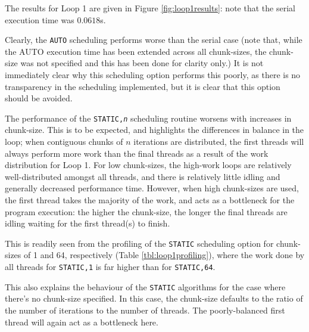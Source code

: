 \documentclass{article} %
\newcommand{\tp}{\texttt}
\begin{document}
The results for Loop 1 are given in Figure \ref{fig:loop1results}: note that the serial execution time was $0.0618$s.

Clearly, the \tp{AUTO} scheduling performs worse than the serial case (note that, while the AUTO execution time has been extended across all chunk-sizes, the chunk-size was not specified and this has been done for clarity only.)
It is not immediately clear why this scheduling option performs this poorly, as there is no transparency in the scheduling implemented, but it is clear that this option should be avoided.

The performance of the \tp{STATIC,\textit{n}} scheduling routine worsens with increases in chunk-size.
This is to be expected, and highlights the differences in balance in the loop; when contiguous chunks of $n$ iterations are distributed, the first threads will always perform more work than the final threads as a result of the work distribution for Loop 1.
For low chunk-sizes, the high-work loops are relatively well-distributed amongst all threads, and there is relatively little idling and generally decreased performance time.
However, when high chunk-sizes are used, the first thread takes the majority of the work, and acts as a bottleneck for the program execution: the higher the chunk-size, the longer the final threads are idling waiting for the first thread(s) to finish.

This is readily seen from the profiling of the \tp{STATIC} scheduling option for chunk-sizes of 1 and 64, respectively (Table \ref{tbl:loop1profiling}), where the work done by all threads for \tp{STATIC,1} is far higher than for \tp{STATIC,64}.

This also explains the behaviour of the \tp{STATIC} algorithms for the case where there's no chunk-size specified.
In this case, the chunk-size defaults to the ratio of the number of iterations to the number of threads.
The poorly-balanced first thread will again act as a bottleneck here.
\end{document}
